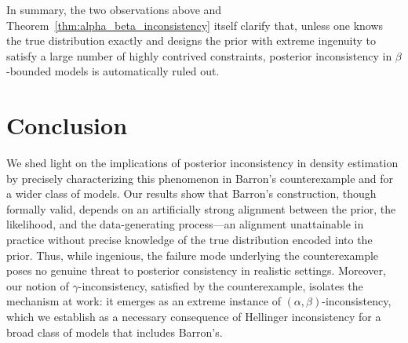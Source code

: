 \documentclass[11pt,twoside]{article}
\begin{document}
In summary, the two observations above and Theorem~\ref{thm:alpha_beta_inconsistency} itself clarify that, unless one knows the true distribution exactly and designs the prior with extreme ingenuity to satisfy a large number of highly contrived constraints, posterior inconsistency in $\beta$-bounded models is automatically ruled out.



\section{Conclusion}\label{sec:conclusion}

We shed light on the implications of posterior inconsistency in density estimation by precisely characterizing this phenomenon in Barron’s counterexample and for a wider class of models. Our results show that Barron’s construction, though formally valid, depends on an artificially strong alignment between the prior, the likelihood, and the data-generating process—an alignment unattainable in practice without precise knowledge of the true distribution encoded into the prior. Thus, while ingenious, the failure mode underlying the counterexample poses no genuine threat to posterior consistency in realistic settings. Moreover, our notion of $\gamma$-inconsistency, satisfied by the counterexample, isolates the mechanism at work: it emerges as an extreme instance of $(\alpha,\beta)$-inconsistency, which we establish as a necessary consequence of Hellinger inconsistency for a broad class of models that includes Barron’s.
\end{document}
